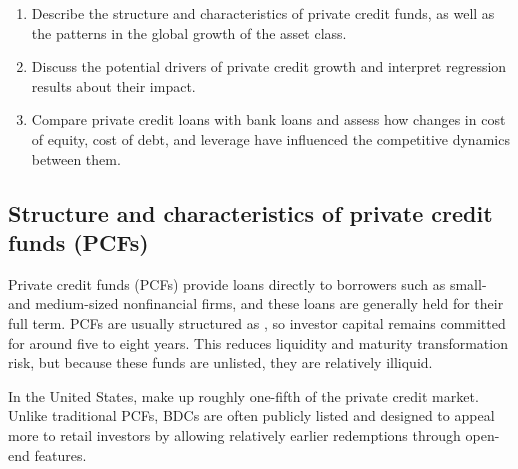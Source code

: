 
\begin{cikeybox}[title={The three objectives, in the spine's own words}]
\begin{enumerate}[label=\textbf{\alph*.}]
\item Describe the structure and characteristics of private credit funds, as well as the
patterns in the global growth of the asset class.
\item Discuss the potential drivers of private credit growth and interpret regression results
about their impact.
\item Compare private credit loans with bank loans and assess how changes in cost of equity,
cost of debt, and leverage have influenced the competitive dynamics between them.
\end{enumerate}
\end{cikeybox}


\subsection*{Structure and characteristics of private credit funds (PCFs)}

Private credit funds (PCFs) provide loans directly to borrowers such as small- and
medium-sized nonfinancial firms, and these loans are generally held for their full term. PCFs
are usually structured as , so investor capital remains committed for
around five to eight years. This reduces liquidity and maturity transformation risk, but
because these funds are unlisted, they are relatively illiquid.

In the United States,  make up roughly one-fifth
of the private credit market. Unlike traditional PCFs, BDCs are often publicly listed and
designed to appeal more to retail investors by allowing relatively earlier redemptions
through open-end features.

